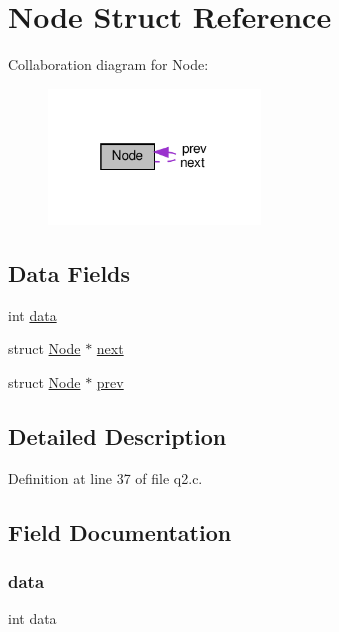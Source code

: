 \hypertarget{struct_node}{}\section{Node Struct Reference}
\label{struct_node}


Collaboration diagram for Node\+:\nopagebreak
\begin{figure}[H]
\begin{center}
\leavevmode
\includegraphics[width=160pt]{struct_node__coll__graph}
\end{center}
\end{figure}
\subsection*{Data Fields}
\begin{DoxyCompactItemize}
\item 
int \hyperlink{struct_node_a9eab91667db4d35c7231dcddf7b89a76}{data}
\item 
struct \hyperlink{struct_node}{Node} $\ast$ \hyperlink{struct_node_aa162dd1e0693188a22b1f13b9a2a0ef0}{next}
\item 
struct \hyperlink{struct_node}{Node} $\ast$ \hyperlink{struct_node_ab61af691843e7459182834757ed63fe0}{prev}
\end{DoxyCompactItemize}


\subsection{Detailed Description}


Definition at line 37 of file q2.\+c.



\subsection{Field Documentation}
\mbox{\label{struct_node_a9eab91667db4d35c7231dcddf7b89a76}} 
\subsubsection{\texorpdfstring{data}{data}}
{\footnotesize\ttfamily int data}



